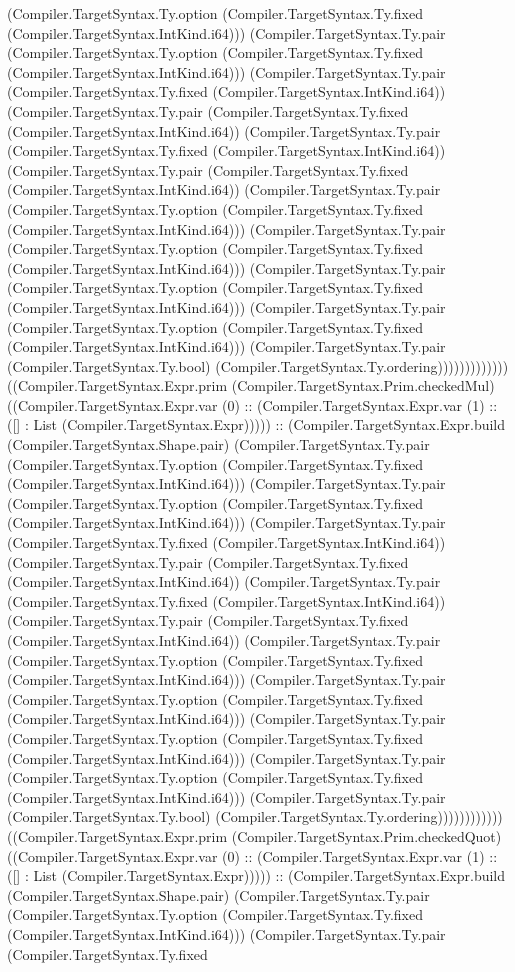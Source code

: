 \documentclass[11pt]{article}
\begin{document}
(Compiler.TargetSyntax.Ty.option (Compiler.TargetSyntax.Ty.fixed (Compiler.TargetSyntax.IntKind.i64))) (Compiler.TargetSyntax.Ty.pair (Compiler.TargetSyntax.Ty.option (Compiler.TargetSyntax.Ty.fixed (Compiler.TargetSyntax.IntKind.i64))) (Compiler.TargetSyntax.Ty.pair (Compiler.TargetSyntax.Ty.fixed (Compiler.TargetSyntax.IntKind.i64)) (Compiler.TargetSyntax.Ty.pair (Compiler.TargetSyntax.Ty.fixed (Compiler.TargetSyntax.IntKind.i64)) (Compiler.TargetSyntax.Ty.pair (Compiler.TargetSyntax.Ty.fixed (Compiler.TargetSyntax.IntKind.i64)) (Compiler.TargetSyntax.Ty.pair (Compiler.TargetSyntax.Ty.fixed (Compiler.TargetSyntax.IntKind.i64)) (Compiler.TargetSyntax.Ty.pair (Compiler.TargetSyntax.Ty.option (Compiler.TargetSyntax.Ty.fixed (Compiler.TargetSyntax.IntKind.i64))) (Compiler.TargetSyntax.Ty.pair (Compiler.TargetSyntax.Ty.option (Compiler.TargetSyntax.Ty.fixed (Compiler.TargetSyntax.IntKind.i64))) (Compiler.TargetSyntax.Ty.pair (Compiler.TargetSyntax.Ty.option (Compiler.TargetSyntax.Ty.fixed (Compiler.TargetSyntax.IntKind.i64))) (Compiler.TargetSyntax.Ty.pair (Compiler.TargetSyntax.Ty.option (Compiler.TargetSyntax.Ty.fixed (Compiler.TargetSyntax.IntKind.i64))) (Compiler.TargetSyntax.Ty.pair (Compiler.TargetSyntax.Ty.bool) (Compiler.TargetSyntax.Ty.ordering))))))))))))) ((Compiler.TargetSyntax.Expr.prim (Compiler.TargetSyntax.Prim.checkedMul) ((Compiler.TargetSyntax.Expr.var (0) :: (Compiler.TargetSyntax.Expr.var (1) :: ([] : List (Compiler.TargetSyntax.Expr))))) :: (Compiler.TargetSyntax.Expr.build (Compiler.TargetSyntax.Shape.pair) (Compiler.TargetSyntax.Ty.pair (Compiler.TargetSyntax.Ty.option (Compiler.TargetSyntax.Ty.fixed (Compiler.TargetSyntax.IntKind.i64))) (Compiler.TargetSyntax.Ty.pair (Compiler.TargetSyntax.Ty.option (Compiler.TargetSyntax.Ty.fixed (Compiler.TargetSyntax.IntKind.i64))) (Compiler.TargetSyntax.Ty.pair (Compiler.TargetSyntax.Ty.fixed (Compiler.TargetSyntax.IntKind.i64)) (Compiler.TargetSyntax.Ty.pair (Compiler.TargetSyntax.Ty.fixed (Compiler.TargetSyntax.IntKind.i64)) (Compiler.TargetSyntax.Ty.pair (Compiler.TargetSyntax.Ty.fixed (Compiler.TargetSyntax.IntKind.i64)) (Compiler.TargetSyntax.Ty.pair (Compiler.TargetSyntax.Ty.fixed (Compiler.TargetSyntax.IntKind.i64)) (Compiler.TargetSyntax.Ty.pair (Compiler.TargetSyntax.Ty.option (Compiler.TargetSyntax.Ty.fixed (Compiler.TargetSyntax.IntKind.i64))) (Compiler.TargetSyntax.Ty.pair (Compiler.TargetSyntax.Ty.option (Compiler.TargetSyntax.Ty.fixed (Compiler.TargetSyntax.IntKind.i64))) (Compiler.TargetSyntax.Ty.pair (Compiler.TargetSyntax.Ty.option (Compiler.TargetSyntax.Ty.fixed (Compiler.TargetSyntax.IntKind.i64))) (Compiler.TargetSyntax.Ty.pair (Compiler.TargetSyntax.Ty.option (Compiler.TargetSyntax.Ty.fixed (Compiler.TargetSyntax.IntKind.i64))) (Compiler.TargetSyntax.Ty.pair (Compiler.TargetSyntax.Ty.bool) (Compiler.TargetSyntax.Ty.ordering)))))))))))) ((Compiler.TargetSyntax.Expr.prim (Compiler.TargetSyntax.Prim.checkedQuot) ((Compiler.TargetSyntax.Expr.var (0) :: (Compiler.TargetSyntax.Expr.var (1) :: ([] : List (Compiler.TargetSyntax.Expr))))) :: (Compiler.TargetSyntax.Expr.build (Compiler.TargetSyntax.Shape.pair) (Compiler.TargetSyntax.Ty.pair (Compiler.TargetSyntax.Ty.option (Compiler.TargetSyntax.Ty.fixed (Compiler.TargetSyntax.IntKind.i64))) (Compiler.TargetSyntax.Ty.pair (Compiler.TargetSyntax.Ty.fixed 
\end{document}
